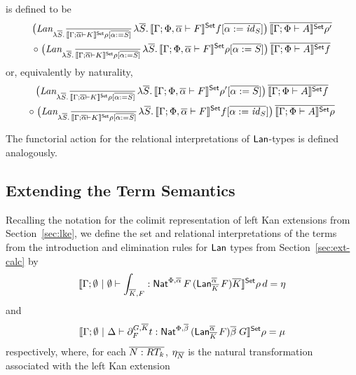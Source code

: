\documentclass{lmcs}
\theoremstyle{plain}\newtheorem{satz}[thm]{Satz}
\renewcommand{\id}{\mathit{id}}
\begin{document}
{\noindent
is defined to be 
\begin{multline*}
\big(\textit{Lan}_{\lambda \ol{S}.\,\ol{\setsem{\Gamma; \ol\alpha
      \vdash K}\rho[\ol{\alpha := S}]}}\,  
      \lambda \ol{S}.\,\setsem{\Gamma; \Phi, \ol\alpha \vdash
        F}f[\ol{\alpha := \id_S}]\big)\, 
    \ol{\setsem{\Gamma; \Phi \vdash A}\rho'} \\
\circ\;
  \big(\textit{Lan}_{\lambda \ol{S}.\,\ol{\setsem{\Gamma; \ol\alpha
        \vdash K}\rho[\ol{\alpha := S}]}}\,  
      \lambda \ol{S}.\,\setsem{\Gamma; \Phi, \ol\alpha \vdash
        F}\rho[\ol{\alpha := S}]\big)\, 
    \ol{\setsem{\Gamma; \Phi \vdash A}f}
\end{multline*}
or, equivalently by naturality,
\begin{multline*}
\big(\textit{Lan}_{\lambda \ol{S}.\,\ol{\setsem{\Gamma; \ol\alpha
      \vdash K}\rho[\ol{\alpha := S}]}}\, 
      \lambda \ol{S}.\,\setsem{\Gamma; \Phi, \ol\alpha \vdash
        F}\rho'[\ol{\alpha := S}]\big)\, 
    \ol{\setsem{\Gamma; \Phi \vdash A}f} \\
\circ\;
  \big(\textit{Lan}_{\lambda \ol{S}.\,\ol{\setsem{\Gamma; \ol\alpha
        \vdash K}\rho[\ol{\alpha := S}]}}\, 
     \lambda \ol{S}.\, \setsem{\Gamma; \Phi, \ol\alpha \vdash
       F}f[\ol{\alpha := \id_S}]\big)\, 
    \ol{\setsem{\Gamma; \Phi \vdash A}\rho}
\end{multline*}

\vspace*{0.05in}

\noindent
The functorial action for the relational interpretations of
$\mathsf{Lan}$-types is defined analogously.

\subsection{Extending the Term Semantics}\label{sec:term-sem}

Recalling the notation for the colimit representation of left Kan
extensions from Section~\ref{sec:lke}, we define the set and
relational interpretations of the terms from the introduction and
elimination rules for $\mathsf{Lan}$ types from Section~\ref{sec:ext-calc} by 
\[
\llbracket{\Gamma;\emptyset~|~\emptyset \vdash \int_{\overline{K},F}
: \mathsf{Nat}^{\Phi, \overline{\alpha}}\, F\, (\mathsf{Lan}^{\overline{\alpha}}_{\overline{K}}\,  F) \overline{K}}\rrbracket^{\mathsf{Set}}\rho\,d
= \eta
\]
and
\[
\llbracket{\Gamma;\emptyset~|~\Delta \vdash \partial^{G, \overline{K}}_F t 
: \mathsf{Nat}^{\Phi, \overline{\beta}}\, (\mathsf{Lan}^{\overline{\alpha}}_{\overline{K}}\,F) \overline{\beta}\; G}\rrbracket^{\mathsf{Set}}\rho
= \mu
\]
respectively, where, for each $\overline{N : RT_k}$, $\eta_{\overline{N}}$
is the natural transformation associated with the left Kan extension

}
\end{document}
